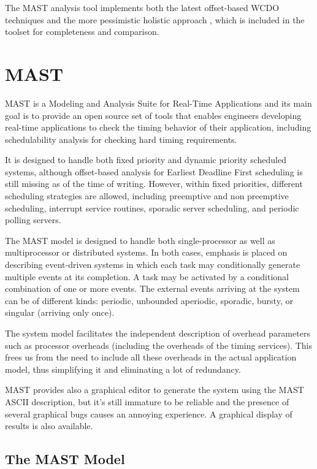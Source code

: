 \documentclass{article}
\begin{document}
The MAST analysis tool implements both the latest offset-based WCDO techniques and the more pessimistic holistic approach \cite{mast}, which is included in the toolset for completeness and comparison.

\section{MAST}

MAST \cite{mast} is a Modeling and Analysis Suite for Real-Time Applications and its main goal is to provide an open source set of tools that enables engineers developing real-time applications to check the timing behavior of their application, including schedulability analysis for checking hard timing requirements.

It is designed to handle both fixed priority and dynamic priority scheduled systems, although offset-based analysis for Earliest Deadline First scheduling is still missing as of the time of writing. However, within fixed priorities, different scheduling strategies are allowed, including preemptive and non preemptive scheduling, interrupt service routines, sporadic server scheduling, and periodic polling servers.

The MAST model is designed to handle both single-processor as well as multiprocessor or distributed systems. In both cases, emphasis is placed on describing event-driven systems in which each task may conditionally generate multiple events at its completion. A task may be activated by a conditional combination of one or more events. The external events arriving at the system can be of different kinds: periodic, unbounded aperiodic, sporadic, bursty, or singular (arriving only once).

The system model facilitates the independent description of overhead parameters such as processor overheads (including the overheads of the timing services). This frees us from the need to include all these overheads in the actual application model, thus simplifying it and eliminating a lot of redundancy.

MAST provides also a graphical editor to generate the system using the MAST ASCII description, but it's still immature to be reliable and the presence of several graphical bugs causes an annoying experience. A graphical display of results is also available.

\subsection{The MAST Model}
\end{document}
